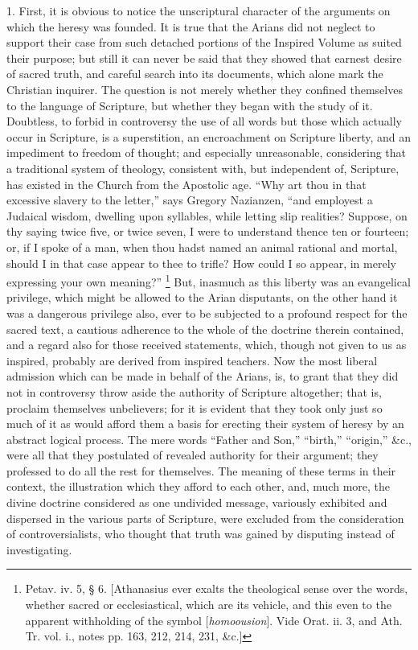 1. First, it is obvious to notice the unscriptural character of the
arguments on which the heresy was founded. It is true that the Arians
did not neglect to support their case from such detached portions of
the Inspired Volume as suited their purpose; but still it can never be
said that they showed that earnest desire of sacred truth, and careful
search into its documents, which alone mark the Christian inquirer.
The question is not merely whether they confined themselves to the
language of Scripture, but whether they began with the study of it.
Doubtless, to forbid in controversy the use of all words but those
which actually occur in Scripture, is a superstition, an encroachment
on Scripture liberty, and an impediment to freedom of thought;
and especially unreasonable, considering that a traditional system of
theology, consistent with, but independent of, Scripture, has existed
in the Church from the Apostolic age. ``Why art thou in that
excessive slavery to the letter,'' says Gregory Nazianzen,
``and employest a Judaical wisdom, dwelling upon syllables, while
letting slip realities? Suppose, on thy saying twice five, or twice
seven, I were to understand thence ten or fourteen; or, if I spoke of
a man, when thou hadst named an animal rational and mortal, should I
in that case appear to thee to trifle? How could I so appear, in
merely expressing your own meaning?'' \footnote{Petav. iv. 5, § 6. [Athanasius ever
exalts the theological sense over the words, whether sacred or
ecclesiastical, which are its vehicle, and this even to the apparent
withholding of the symbol [\emph{homoousion}]. Vide Orat. ii. 3, and
Ath. Tr. vol. i., notes pp. 163, 212, 214, 231, \&c.]} But, inasmuch as this liberty was an evangelical privilege,
which might be allowed to the Arian disputants, on the other hand it
was a dangerous privilege also, ever to be subjected to a profound
respect for the sacred text, a cautious adherence to the whole of the
doctrine therein contained, and a regard also for those received
statements, which, though not given to us as inspired, probably are
derived from inspired teachers. Now the most liberal admission which
can be made in behalf of the Arians, is, to grant that they did not in
controversy throw aside the authority of Scripture altogether; that
is, proclaim themselves unbelievers; for it is evident that they took
only just so much of it as would afford them a basis for erecting
their system of heresy by an abstract logical process. The mere words ``Father and Son,'' ``birth,''
``origin,'' \&c., were all that they postulated of revealed
authority for their argument; they professed to do all the rest for
themselves. The meaning of these terms in their context, the
illustration which they afford to each other, and, much more, the
divine doctrine considered as one undivided message, variously
exhibited and dispersed in the various parts of Scripture, were
excluded from the consideration of controversialists, who thought that
truth was gained by disputing instead of investigating.

